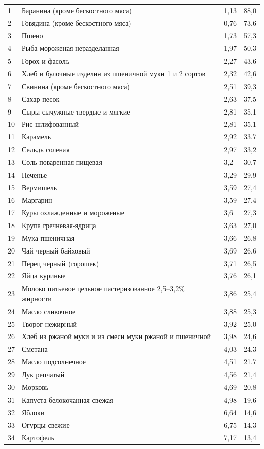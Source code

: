 \begin{longtable}{|p{1cm}|p{8.5cm}|p{3.5cm}|p{3cm}|}
	\footnotesize %
	1   & Баранина (кроме бескостного мяса) & 1,13 & 88,0 \\
	2   & Говядина (кроме бескостного мяса) & 0,76 & 73,6 \\
	3   & Пшено & 1,73 & 57,3 \\
	4   & Рыба мороженая неразделанная & 1,97 & 50,3 \\
	5   & Горох и фасоль & 2,27 & 43,6 \\
	6   & Хлеб и булочные изделия из пшеничной муки 1 и 2 сортов & 2,32 & 42,6 \\
	7   & Свинина (кроме бескостного мяса) & 2,51 & 39,3 \\
	8   & Сахар-песок & 2,63 & 37,5 \\
	9   & Сыры сычужные твердые и мягкие & 2,81 & 35,1 \\
	10  & Рис шлифованный & 2,81 & 35,1 \\
	11  & Карамель & 2,92 & 33,7 \\
	12  & Сельдь соленая & 2,97 & 33,2 \\
	13  & Соль поваренная пищевая & 3,2 & 30,7 \\
	14  & Печенье & 3,29 & 29,9 \\
	15  & Вермишель & 3,59 & 27,4 \\
	16  & Маргарин & 3,59 & 27,4 \\
	17  & Куры охлажденные и мороженые & 3,6 & 27,3 \\
	18  & Крупа гречневая-ядрица & 3,63 & 27,0 \\
	19  & Мука пшеничная & 3,66 & 26,8 \\
	20  & Чай черный байховый & 3,69 & 26,6 \\
	21  & Перец черный (горошек) & 3,71 & 26,5 \\
	22  & Яйца куриные & 3,76 & 26,1 \\
	23  & Молоко питьевое цельное пастеризованное 2,5--3,2\% жирности & 3,86 & 25,4 \\
	24  & Масло сливочное & 3,88 & 25,3 \\
	25  & Творог нежирный & 3,92 & 25,0 \\
	26  & Хлеб из ржаной муки и из смеси муки ржаной и пшеничной & 3,98 & 24,6 \\
	27  & Сметана & 4,03 & 24,3 \\
	28  & Масло подсолнечное & 4,51 & 21,7 \\
	29  & Лук репчатый & 4,56 & 21,4 \\
	30  & Морковь & 4,69 & 20,8 \\
	31  & Капуста белокочанная свежая & 4,98 & 19,6 \\
	32  & Яблоки & 6,64 & 14,6 \\
	33  & Огурцы свежие & 6,75 & 14,3 \\
	34  & Картофель & 7,17 & 13,4 \\
	
\end{longtable}
\noindent
{}


